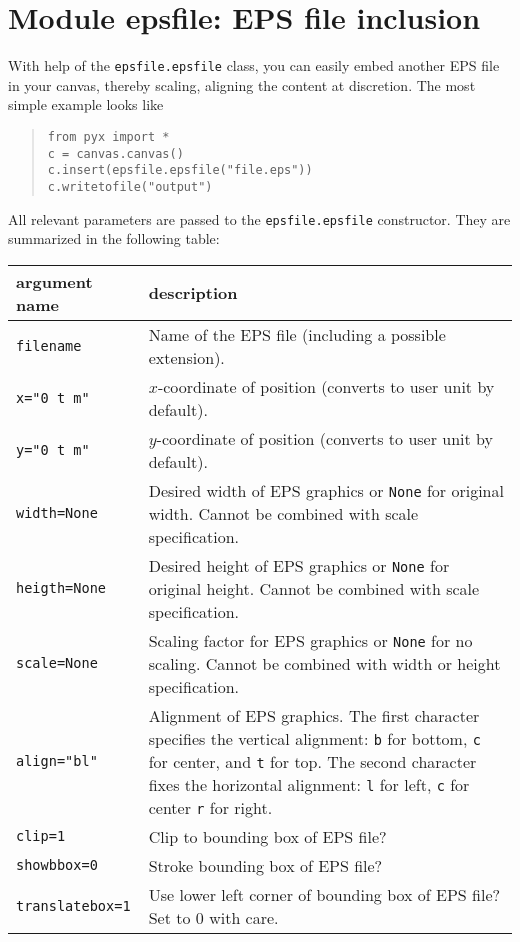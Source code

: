 \chapter{Module epsfile: EPS file inclusion}

With help of the \verb|epsfile.epsfile| class, you can easily embed
another EPS file in your canvas, thereby scaling, aligning the content
at discretion. The most simple example looks like
\begin{quote}
\begin{verbatim}
from pyx import *
c = canvas.canvas()
c.insert(epsfile.epsfile("file.eps"))
c.writetofile("output")
\end{verbatim}
\end{quote}

All relevant parameters are passed to the \verb|epsfile.epsfile|
constructor. They are summarized in the following table:

\medskip
\begin{tabularx}{\linewidth}{l>{\raggedright\arraybackslash}X}
argument name&description\\
\hline
\texttt{filename} & Name of the EPS file (including a possible
extension).\\
\texttt{x="0 t m"} & $x$-coordinate of position (converts to user
unit by default).\\
\texttt{y="0 t m"} & $y$-coordinate of position (converts to user
unit by default).\\
\texttt{width=None} & Desired width of EPS graphics or \texttt{None}
for original width. Cannot be combined with scale specification.\\
\texttt{heigth=None} & Desired height of EPS graphics or \texttt{None}
for original height. Cannot be combined with scale specification.\\
\texttt{scale=None} & Scaling factor for EPS graphics or \texttt{None}
for no scaling. Cannot be combined with width or height specification.\\
\texttt{align="bl"} & Alignment of EPS graphics. The first character
specifies the vertical alignment: \texttt{b} for bottom, \texttt{c}
for center, and \texttt{t} for top. The second character fixes the
horizontal alignment: \texttt{l} for left, \texttt{c} for center
\texttt{r} for right.\\
\texttt{clip=1} & Clip to bounding box of EPS file?\\
\texttt{showbbox=0} & Stroke bounding box of EPS file?\\
\texttt{translatebox=1} & Use lower left corner of bounding box of EPS
file? Set to $0$ with care.
\end{tabularx}



\label{epsfile}


